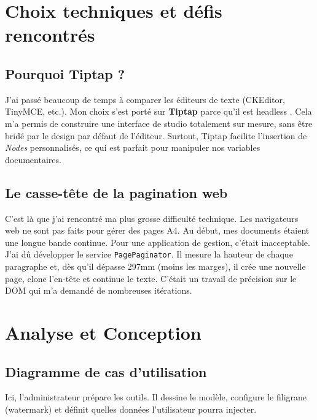 \section{Choix techniques et défis rencontrés}

\subsection{Pourquoi Tiptap ?}

J'ai passé beaucoup de temps à comparer les éditeurs de texte (CKEditor, TinyMCE, etc.). Mon choix s'est porté sur \textbf{Tiptap} parce qu'il est \og headless \fg{}. Cela m'a permis de construire une interface de studio totalement sur mesure, sans être bridé par le design par défaut de l'éditeur. Surtout, Tiptap facilite l'insertion de \textit{Nodes} personnalisés, ce qui est parfait pour manipuler nos variables documentaires.

\subsection{Le casse-tête de la pagination web}

C'est là que j'ai rencontré ma plus grosse difficulté technique. Les navigateurs web ne sont pas faits pour gérer des pages A4. Au début, mes documents étaient une longue bande continue. Pour une application de gestion, c'était inacceptable. J'ai dû développer le service \texttt{PagePaginator}. Il mesure la hauteur de chaque paragraphe et, dès qu'il dépasse 297mm (moins les marges), il crée une nouvelle page, clone l'en-tête et continue le texte. C'était un travail de précision sur le DOM qui m'a demandé de nombreuses itérations.

\section{Analyse et Conception}

\subsection{Diagramme de cas d'utilisation}

Ici, l'administrateur prépare les outils. Il dessine le modèle, configure le filigrane (watermark) et définit quelles données l'utilisateur pourra injecter.


